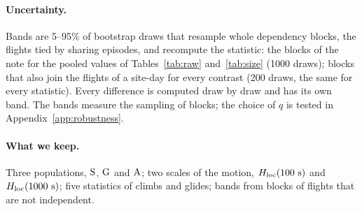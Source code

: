 \paragraph{Uncertainty.} Bands are 5--95\% of bootstrap draws that resample whole dependency blocks,
the flights tied by sharing episodes, and recompute the statistic: the blocks of the note for the
pooled values of Tables~\ref{tab:raw} and~\ref{tab:size} (1000 draws); blocks that also join the
flights of a site-day for every contrast (200 draws, the same for every statistic). Every difference
is computed draw by draw and has its own band. The bands measure the sampling of blocks; the choice of
$q$ is tested in Appendix~\ref{app:robustness}.

\paragraph{What we keep.} Three populations, $\mathrm{S}$, $\mathrm{G}$ and $\mathrm{A}$; two scales of the motion,
$H_\mathrm{loc}(100~\mathrm{s})$ and $H_\mathrm{loc}(1000~\mathrm{s})$; five statistics of climbs and glides; bands from
blocks of flights that are not independent.
